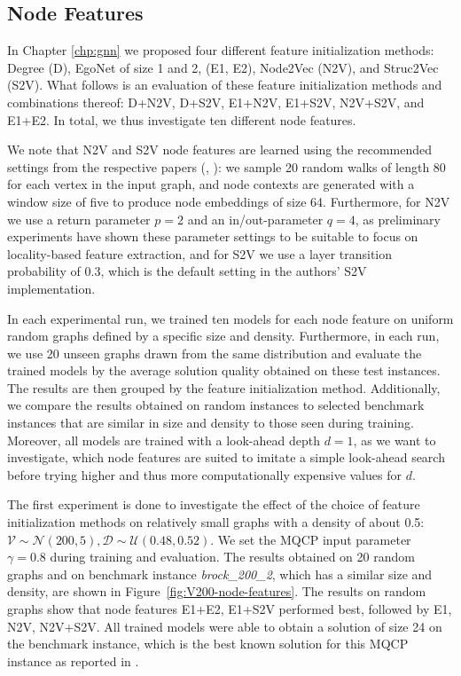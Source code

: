 \documentclass[draft,final]{vutinfth} %
\begin{document}
\subsection{Node Features}\label{subsec:node-features}
In Chapter \ref{chp:gnn} we proposed four different feature initialization methods: Degree (D), EgoNet of size 1 and 2, (E1, E2), Node2Vec (N2V), and Struc2Vec (S2V). What follows is an evaluation of these feature initialization methods and combinations thereof: D+N2V, D+S2V, E1+N2V, E1+S2V, N2V+S2V, and E1+E2. In total, we thus investigate ten different node features. 

We note that N2V and S2V node features are learned using the recommended settings from the respective papers (\cite{GroverL16}, \cite{FigueiredoRS17}): we sample 20 random walks of length 80 for each vertex in the input graph, and node contexts are generated with a window size of five to produce node embeddings of size 64. Furthermore, for N2V we use a return parameter $p=2$ and an in/out-parameter $q=4$, as preliminary experiments have shown these parameter settings to be suitable to focus on locality-based feature extraction, and for S2V we use a layer transition probability of $0.3$, which is the default setting in the authors' S2V implementation. 

In each experimental run, we trained ten models for each node feature on uniform random graphs defined by a specific size and density. 
Furthermore, in each run, we use 20 unseen graphs drawn from the same distribution and evaluate the trained models by the average solution quality obtained on these test instances. The results are then grouped by the feature initialization method. Additionally, we compare the results obtained on random instances to selected benchmark instances that are similar in size and density to those seen during training. 
Moreover, all models are trained with a look-ahead depth $d=1$, as we want to investigate, which node features are suited to imitate a simple look-ahead search before trying higher and thus more computationally expensive values for $d$. 

The first experiment is done to investigate the effect of the choice of feature initialization methods on relatively small graphs with a density of about 0.5: $\mathcal{V} \sim \mathcal{N}(200, 5), \mathcal{D} \sim \mathcal{U}(0.48, 0.52)$. We set the MQCP input parameter $\gamma=0.8$ during training and evaluation. 
The results obtained on 20 random graphs and on benchmark instance \emph{brock\_200\_2}, which has a similar size and density, are shown in Figure~\ref{fig:V200-node-features}. 
The results on random graphs show that node features E1+E2, E1+S2V performed best, followed by E1, N2V, N2V+S2V. 
All trained models were able to obtain a solution of size 24 on the benchmark instance, which is the best known solution for this MQCP instance as reported in \cite{peng_solving_2021}. 
\end{document}
